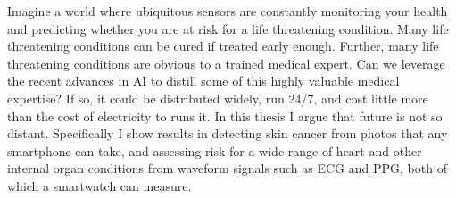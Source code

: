 Imagine a world where ubiquitous sensors are constantly monitoring your health and predicting whether you are at risk for a life threatening condition.  Many life threatening conditions can be cured if treated early enough.  Further, many life threatening conditions are obvious to a trained medical expert.  Can we leverage the recent advances in AI to distill some of this highly valuable medical expertise?  If so, it could be distributed widely, run 24/7, and cost little more than the cost of electricity to runs it.  In this thesis I argue that future is not so distant.  Specifically I show results in detecting skin cancer from photos that any smartphone can take, and assessing risk for a wide range of heart and other internal organ conditions from waveform signals such as ECG and PPG, both of which a smartwatch can measure.
